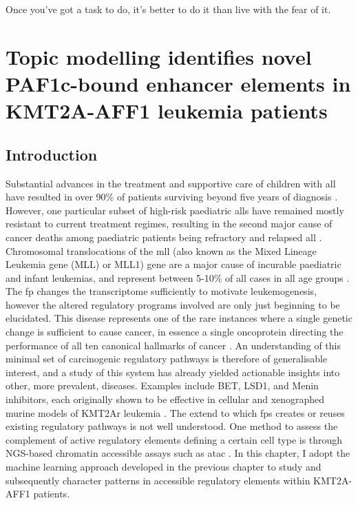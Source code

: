 \begin{savequote}[8cm]
    Once you've got a task to do, it's better to do it than live with the fear of it.
\end{savequote}

\chapter{Topic modelling identifies novel PAF1c-bound enhancer elements in KMT2A-AFF1 leukemia patients}

\minitoc


\section{Introduction} \label{ch5:intro}

Substantial advances in the treatment and supportive care of children with \gls{all} have resulted in over 90\% of patients surviving beyond five years of diagnosis \cite{Inaba2021}. However, one particular subset of high-risk paediatric \glspl{all} have remained mostly resistant to current treatment regimes, resulting in the second major cause of cancer deaths among paediatric patients being refractory and relapsed \gls{all} \cite{Inaba2021}. Chromosomal translocations of the \gls{mll} (also known as the Mixed Lineage Leukemia gene (MLL) or MLL1) gene are a major cause of incurable paediatric and infant leukemias, and represent between 5-10\% of \gls{all} cases in all age groups \cite{Rice2020b}. The \gls{fp} changes the transcriptome sufficiently to motivate leukemogenesis, however the altered regulatory programs involved are only just beginning to be elucidated. This disease represents one of the rare instances where a single genetic change is sufficient to cause cancer, in essence a single oncoprotein directing the performance of all ten canonical hallmarks of cancer \cite{Rao2015,Hanahan2011}. An understanding of this minimal set of carcinogenic regulatory pathways is therefore of generalisable interest, and a study of this system has already yielded actionable insights into other, more prevalent, diseases. Examples include BET, LSD1, and Menin inhibitors, each originally shown to be effective in cellular and xenographed murine models of KMT2Ar leukemia \cite{Issa2021,Fang2019,Shorstova2021,Abedin2016}. The extend to which \glspl{fp} creates or reuses existing regulatory pathways is not well understood. One method to assess the complement of active regulatory elements defining a certain cell type is through NGS-based chromatin accessible assays such as \gls{atac} \cite{Minnoye2021, Liu2020}. In this chapter, I adopt the machine learning approach developed in the previous chapter to study and subsequently character patterns in accessible regulatory elements within KMT2A-AFF1 patients.  

